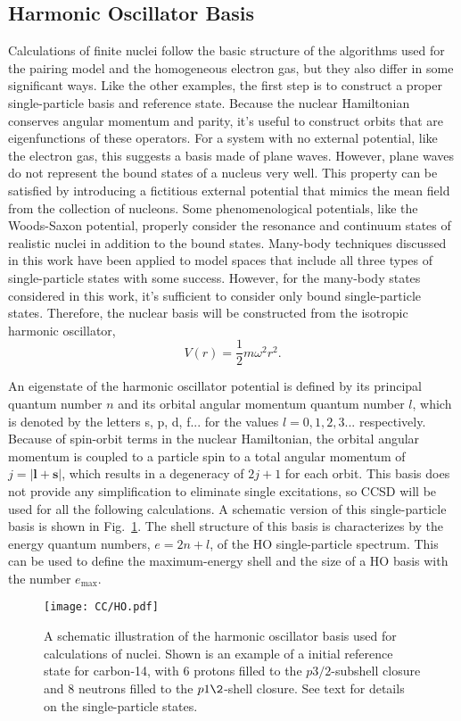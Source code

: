 \documentclass[thesis.tex]{subfiles}
\begin{document}
\subsection{Harmonic Oscillator Basis} \label{section:ho_basis}
Calculations of finite nuclei follow the basic structure of the algorithms used for the pairing model and the homogeneous electron gas, but they also differ in some significant ways.  Like the other examples, the first step is to construct a proper single-particle basis and reference state.  Because the nuclear Hamiltonian conserves angular momentum and parity, it's useful to construct orbits that are eigenfunctions of these operators.  For a system with no external potential, like the electron gas, this suggests a basis made of plane waves.  However, plane waves do not represent the bound states of a nucleus very well.  This property can be satisfied by introducing a fictitious external potential that mimics the mean field from the collection of nucleons.  Some phenomenological potentials, like the Woods-Saxon potential, properly consider the resonance and continuum states of realistic nuclei in addition to the bound states.  Many-body techniques discussed in this work have been applied to model spaces that include all three types of single-particle states \cite{MICHEL2006,HAGEN2007169} with some success.  However, for the many-body states considered in this work, it's sufficient to consider only bound single-particle states.  Therefore, the nuclear basis will be constructed from the isotropic harmonic oscillator,
\begin{equation}
  V\left(r\right) = \frac{1}{2}m\omega^{2}r^{2}.
\end{equation}

An eigenstate of the harmonic oscillator potential is defined by its principal quantum number $n$ and its orbital angular momentum quantum number $l$, which is denoted by the letters s, p, d, f... for the values $l=0,1,2,3...$ respectively.  Because of spin-orbit terms in the nuclear Hamiltonian, the orbital angular momentum is coupled to a particle spin to a total angular momentum of $j = \lvert \mathbf{l} + \mathbf{s} \rvert$, which results in a degeneracy of $2j + 1$ for each orbit.  This basis does not provide any simplification to eliminate single excitations, so CCSD will be used for all the following calculations.  A schematic version of this single-particle basis is shown in Fig.\ \ref{fig:Harmonic_Oscillator}.  The shell structure of this basis is characterizes by the energy quantum numbers, $e = 2n + l$, of the HO single-particle spectrum.  This can be used to define the maximum-energy shell and the size of a HO basis with the number $e_{\mathrm{max}}$.
\begin{figure}[h]
  \centering
  \texttt{[image: CC/HO.pdf]}
  \caption{A schematic illustration of the harmonic oscillator basis used for calculations of nuclei. Shown is an example of a initial reference state for carbon-14, with 6 protons filled to the $p3/2$-subshell closure and 8 neutrons filled to the $p1\2$-shell closure.  See text for details on the single-particle states.}
  \label{fig:Harmonic_Oscillator}
\end{figure}
\end{document}
